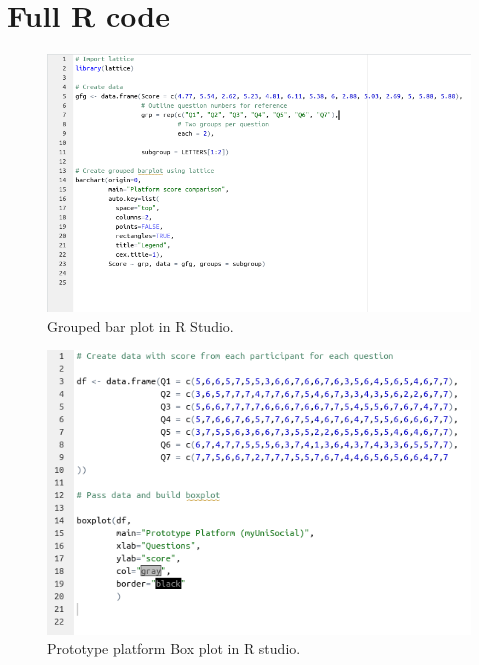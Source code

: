 \documentclass[lettersize,journal]{IEEEtran}
\begin{document}
\section{Full R code}
	



\begin{figure}[h!]
		\includegraphics[width=0.7\paperwidth]{images/groupedBarRcode.png}
                \caption{Grouped bar plot in R Studio.}
                \label{figure 4}
\end{figure}
\begin{figure}[h!]
                \includegraphics[width=0.7\paperwidth]{images/prototypeRcode.png}
                \caption{Prototype platform Box plot in R studio.}
                \label{figure 4}
\end{figure}
\end{document}
